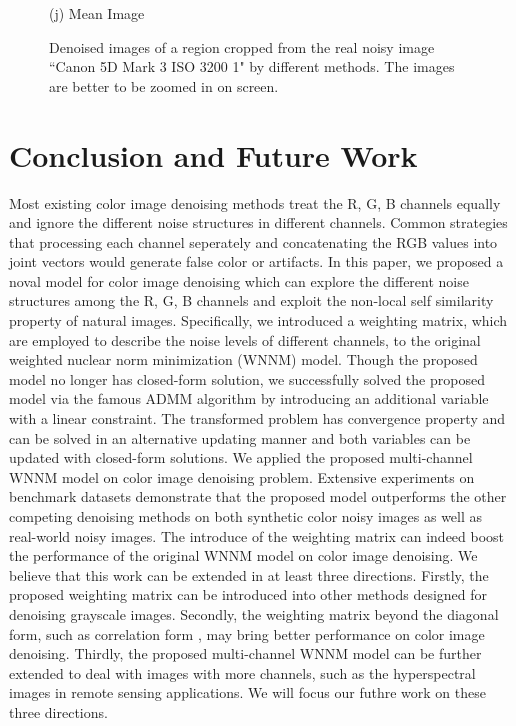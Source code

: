 \documentclass[10pt,twocolumn,letterpaper,sort&compress]{article}
\begin{document}
\begin{figure}
{\begin{minipage}[t]{0.195\textwidth}
{\footnotesize (j) Mean Image \cite{crosschannel2016}}
\end{minipage}
}\vspace{-0.5mm}
\caption{Denoised images of a region cropped from the real noisy image ``Canon 5D Mark 3 ISO 3200 1" \cite{crosschannel2016} by different methods. The images are better to be zoomed in on screen.}
\label{fig7}
\vspace{0.5mm}
\end{figure}

\section{Conclusion and Future Work}
Most existing color image denoising methods treat the R, G, B channels equally and ignore the different noise structures in different channels. Common strategies that processing each channel seperately and concatenating the RGB values into joint vectors would generate false color or artifacts. In this paper, we proposed a noval model for color image denoising which can explore the different noise structures among the R, G, B channels and exploit the non-local self similarity property of natural images. Specifically, we introduced a weighting matrix, which are employed to describe the noise levels of different channels, to the original weighted nuclear norm minimization (WNNM) model. Though the proposed model no longer has closed-form solution, we successfully solved the proposed model via the famous ADMM algorithm by introducing an additional variable with a linear constraint. The transformed problem has convergence property and can be solved in an alternative updating manner and both variables can be updated with closed-form solutions. We applied the proposed multi-channel WNNM model on color image denoising problem. Extensive experiments on benchmark datasets demonstrate that the proposed model outperforms the other competing denoising methods on both synthetic color noisy images as well as real-world noisy images. The introduce of the weighting matrix can indeed boost the performance of the original WNNM model on color image denoising. We believe that this work can be extended in at least three directions. Firstly, the proposed weighting matrix can be introduced into other methods designed for denoising grayscale images. Secondly, the weighting matrix beyond the diagonal form, such as correlation form \cite{nearcor}, may bring better performance on color image denoising. Thirdly, the proposed multi-channel WNNM model can be further extended to deal with images with more channels, such as the hyperspectral images in remote sensing applications. We will focus our futhre work on these three directions.
\end{document}
